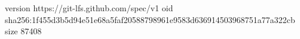version https://git-lfs.github.com/spec/v1
oid sha256:1f455d3b5d94e51e68a5faf20588798961e9583d636914503968751a77a322cb
size 87408
